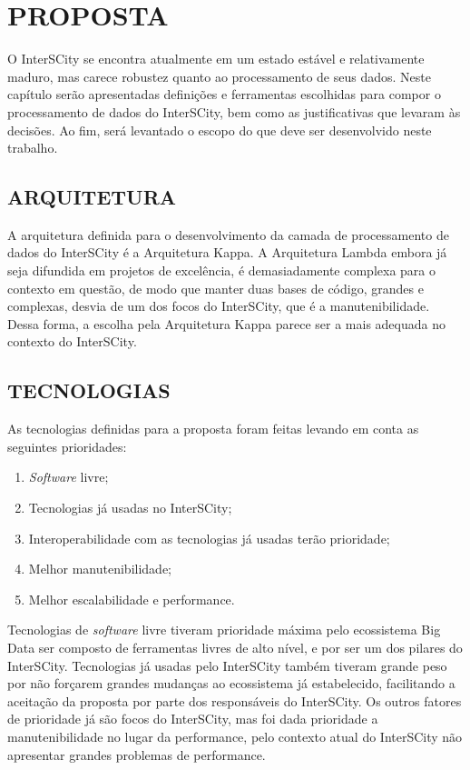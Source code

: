 \chapter[PROPOSTA]{PROPOSTA}

O InterSCity se encontra atualmente em um estado estável e relativamente maduro,
mas carece robustez quanto ao processamento de seus dados. Neste capítulo serão
apresentadas definições e ferramentas escolhidas para compor o processamento
de dados do InterSCity, bem como as justificativas que levaram às decisões. Ao
fim, será levantado o escopo do que deve ser desenvolvido neste trabalho.

\section{ARQUITETURA}

A arquitetura definida para o desenvolvimento da camada de processamento de
dados do InterSCity é a Arquitetura Kappa. A Arquitetura Lambda embora já seja
difundida em projetos de excelência, é demasiadamente complexa para o contexto
em questão, de modo que manter duas bases de código, grandes e complexas,
desvia de um dos focos do InterSCity, que é a manutenibilidade. Dessa forma, a
escolha pela Arquitetura Kappa parece ser a mais adequada no contexto do
InterSCity.

\section{TECNOLOGIAS}

As tecnologias definidas para a proposta foram feitas levando em conta as
seguintes prioridades:

\begin{enumerate}
    \item \textit{Software} livre;
    \item Tecnologias já usadas no InterSCity;
    \item Interoperabilidade com as tecnologias já usadas terão prioridade;
    \item Melhor manutenibilidade;
    \item Melhor escalabilidade e performance.
\end{enumerate}

Tecnologias de \textit{software} livre tiveram prioridade máxima pelo
ecossistema Big Data ser composto de ferramentas livres de alto nível, e por
ser um dos pilares do InterSCity. Tecnologias já usadas pelo InterSCity também
tiveram grande peso por não forçarem grandes mudanças ao ecossistema já
estabelecido, facilitando a aceitação da proposta por parte dos responsáveis do
InterSCity. Os outros fatores de prioridade já são focos do InterSCity,
mas foi dada prioridade a manutenibilidade no lugar da performance, pelo
contexto atual do InterSCity não apresentar grandes problemas de performance.

